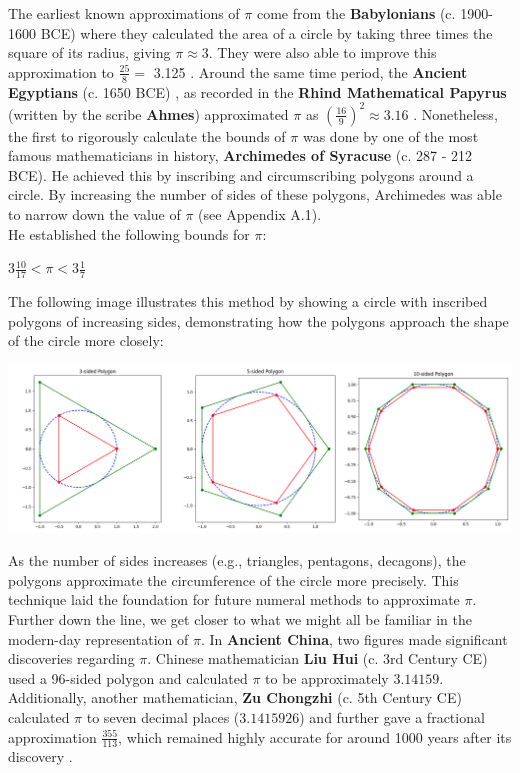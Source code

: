 \documentclass[12pt]{article}
\begin{document}
\noindent The earliest known approximations of $\pi$ come from the \textbf{Babylonians} (c. 1900-1600 BCE) where they calculated the area of a circle by taking three times the square of its radius, giving $\pi \approx 3$. They were also able to improve this approximation to $\frac{25}{8} = $ 3.125 \cite{exploratorium_pi}. Around the same time period, the \textbf{Ancient Egyptians} (c. 1650 BCE) , as recorded in the \textbf{Rhind Mathematical Papyrus} (written by the scribe \textbf{Ahmes}) approximated $\pi$ as $(\frac{16}{9})^2 \approx 3.16$ \cite{exploratorium_pi}. Nonetheless, the first to rigorously calculate the bounds of $\pi$ was done by one of the most famous mathematicians in history, \textbf{Archimedes of Syracuse} (c. 287 - 212 BCE). He achieved this by inscribing and circumscribing polygons around a circle. By increasing the number of sides of these polygons, Archimedes was able to narrow down the value of $\pi$ \cite{b2020archimedesshowedpiapproximately} (see Appendix A.1).\\

\noindent He established the following bounds for $\pi$:
\begin{center}
    $3\frac{10}{17} < \pi < 3\frac{1}{7}$
\end{center}
The following image illustrates this method by showing a circle with inscribed polygons of increasing sides, demonstrating how the polygons approach the shape of the circle more closely:
\begin{center}
\includegraphics[width=1\textwidth]{images/Figure_1.png}
\end{center}

\noindent As the number of sides increases (e.g., triangles, pentagons, decagons), the polygons approximate the circumference of the circle more precisely. This technique laid the foundation for future numeral methods to approximate $\pi$. \\

\noindent Further down the line, we get closer to what we might all be familiar in the modern-day representation of $\pi$. In \textbf{Ancient China}, two figures made significant discoveries regarding $\pi$. Chinese mathematician \textbf{Liu Hui} (c. 3rd Century CE) used a 96-sided polygon and calculated $\pi$ to be approximately $3.14159$. Additionally, another mathematician, \textbf{Zu Chongzhi} (c. 5th Century CE) calculated $\pi$ to seven decimal places ($3.1415926$) and further gave a fractional approximation $\frac{355}{113}$, which remained highly accurate for around 1000 years after its discovery \cite{straffin1998}.  \\
\end{document}

